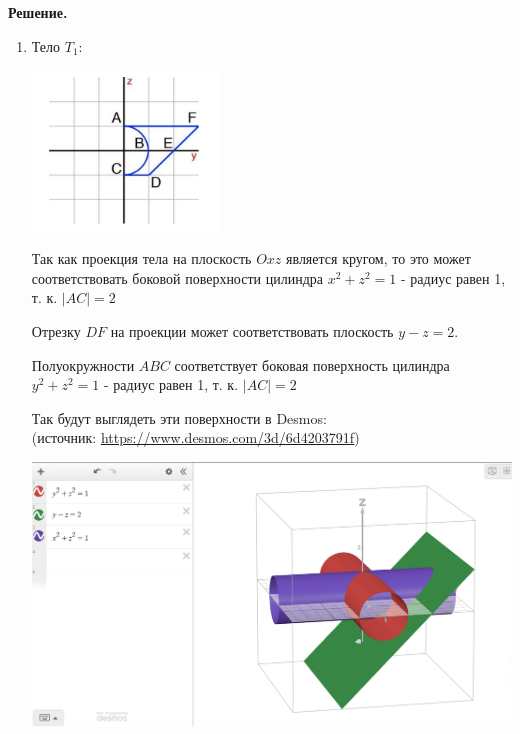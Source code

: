 \vspace{10mm}
\textbf{Решение.}

\begin{enumerate}
    \item Тело $T_1$:
    \vspace{2mm}

    \begin{center}
        \includegraphics[width=5cm]{images/4a1}
    \end{center}

    \vspace{2mm}

    Так как проекция тела на плоскость $Oxz$ является кругом, то это может соответствовать боковой поверхности цилиндра $x^2 + z^2 = 1$ - радиус равен 1, т. к. $|AC| = 2$

    Отрезку $DF$ на проекции может соответствовать плоскость $y - z = 2$.

    Полуокружности $ABC$ соответствует боковая поверхность цилиндра $y^2 + z^2 = 1$ - радиус равен 1, т. к. $|AC| = 2$

    Так будут выглядеть эти поверхности в Desmos: \\(источник: \url{https://www.desmos.com/3d/6d4203791f})

    \begin{center}
        \includegraphics[width=15cm]{images/4a2}
    \end{center}


\end{enumerate}
